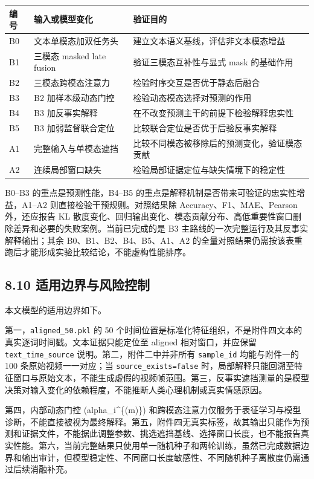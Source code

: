 \documentclass[
  12pt,
  a4paper,
]{ctexart}
\begin{document}
\begin{longtable}[]{@{}lll@{}}
\toprule
编号 & 输入或模型变化 & 验证目的 \\
\midrule
\endhead
B0 & 文本单模态加双任务头 & 建立文本语义基线，评估非文本模态增益 \\
B1 & 三模态 masked late fusion & 验证三模态互补性与显式 mask
的基础作用 \\
B2 & 三模态跨模态注意力 & 检验时序交互是否优于静态后融合 \\
B3 & B2 加样本级动态门控 & 检验动态模态选择对预测的作用 \\
B4 & B3 加反事实解释 & 在不改变预测主干的前提下检验解释忠实性 \\
B5 & B3 加弱监督联合定位 & 比较联合定位是否优于后验反事实解释 \\
A1 & 完整输入与单模态遮挡 &
比较不同模态被移除后的预测变化，验证模态贡献 \\
A2 & 连续局部窗口缺失 & 检验局部证据定位与缺失情境下的稳定性 \\
\bottomrule
\end{longtable}

B0--B3 的重点是预测性能，B4--B5
的重点是解释机制是否带来可验证的忠实性增益，A1--A2
则直接检验干预规则。对照结果除 Accuracy、F1、MAE、Pearson 外，还应报告
KL
散度变化、回归输出变化、模态贡献分布、高低重要性窗口删除差异和必要的失败案例。当前已完成的是
B3 主路线的一次完整运行及其反事实解释输出；其余
B0、B1、B2、B4、B5、A1、A2
的全量对照结果仍需按该表重跑后才能形成实验比较结论，不能虚构性能排序。

\hypertarget{ux9002ux7528ux8fb9ux754cux4e0eux98ceux9669ux63a7ux5236}{%
\subsection{8.10
适用边界与风险控制}\label{ux9002ux7528ux8fb9ux754cux4e0eux98ceux9669ux63a7ux5236}}

本文模型的适用边界如下。

第一，\texttt{aligned\_50.pkl} 的 50
个时间位置是标准化特征组织，不是附件四文本的真实逐词时间戳。文本证据只能定位至
aligned 相对窗口，并应保留 \texttt{text\_time\_source}
说明。第二，附件二中并非所有 \texttt{sample\_id} 均能与附件一的 100
条原始视频一一对应；当 \texttt{source\_exists=false}
时，局部解释只能回溯至特征窗口与原始文本，不能生成虚假的视频帧范围。第三，反事实遮挡测量的是模型决策对输入变化的依赖程度，不能推断人类心理机制或真实情感原因。

第四，内部动态门控 (alpha\_i\^{}\{(m)\})
和跨模态注意力仅服务于表征学习与模型诊断，不能直接被视为最终解释。第五，附件四无真实标签，故其输出只能作为预测和证据文件，不能据此调整参数、挑选遮挡基线、选择窗口长度，也不能报告真实性能。第六，当前完整结果只使用单一随机种子和两轮训练，虽然已完成数据边界和输出审计，但模型稳定性、不同窗口长度敏感性、不同随机种子离散度仍需通过后续消融补充。
\end{document}
